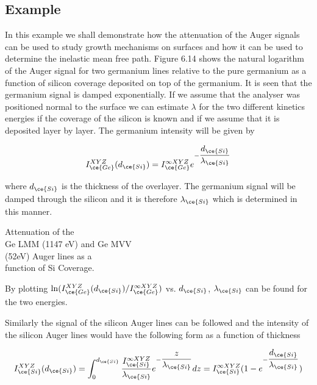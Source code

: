 \subsection{Example}
In this example we shall demonstrate how the attenuation of the Auger signals can be used to study growth mechanisms on surfaces and how it can be used to determine the inelastic mean free path. Figure 6.14 shows the natural logarithm of the Auger signal for two germanium lines relative to the pure germanium as a function of silicon coverage deposited on top of the germanium. It is seen that the germanium signal is damped exponentially. If we assume that the analyser was positioned normal to the surface we can estimate $\lambda$ for the two different kinetics energies if the coverage of the silicon is known and if we assume that it is deposited layer by layer. The germanium intensity will be given by

\begin{equation}\label{eq:gesignal}
I^{XYZ}_{\ce{Ge}}(d_{\ce{Si}})=I^{\infty XYZ}_{\ce{Ge}}e^{-\dfrac{d_{\ce{Si}}}{\lambda_{\ce{Si}}}}
\end{equation}

where $d_{\ce{Si}}$ is the thickness of the overlayer. The germanium signal will be damped through the silicon and it is therefore $\lambda_{\ce{Si}}$ which is determined in this manner.

           Attenuation of the\\ Ge LMM  (1147
          eV) and Ge MVV\\ (52eV)  Auger  lines  as  a\\  function  of  Si
          Coverage.\\

                      \vspace{9cm}

By plotting $\ln(I^{XYZ}_{\ce{Ge}}(d_{\ce{Si}})/I^{\infty XYZ}_{\ce{Ge}})$ vs. $d_{\ce{Si}}$,  $\lambda_{\ce{Si}}$ can be found for the two energies.

Similarly the signal of the silicon Auger lines can be followed and the intensity of the silicon Auger lines would have the following form as a function of thickness

\begin{equation}\label{eq:sisignal}
I^{XYZ}_{\ce{Si}}(d_{\ce{Si}})=\int_0^{d_{\ce{Si}}}\frac{I^{\infty XYZ}_{\ce{Si}}}{\lambda_{\ce{Si}}}e^{-\dfrac{z}{\lambda_{\ce{Si}}}}dz=I^{\infty XYZ}_{\ce{Si}}(1-e^{-\dfrac{d_{\ce{Si}}}{\lambda_{\ce{Si}}}})
\end{equation}
          
